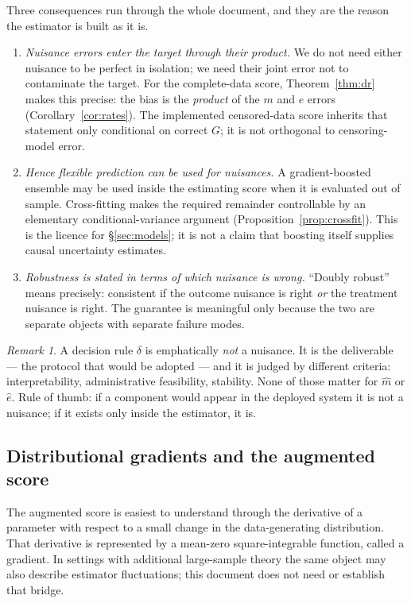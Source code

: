\documentclass[11pt,a4paper]{article}
\theoremstyle{plain}
\theoremstyle{definition}
\theoremstyle{remark}
\newtheorem*{remark*}{Remark}
\begin{document}
Three consequences run through the whole document, and they are the reason the estimator is
built as it is.

\begin{enumerate}[leftmargin=*]
\item \emph{Nuisance errors enter the target through their product.} We do not need either
nuisance to be perfect in isolation; we need their joint error not to contaminate the target.
For the complete-data score, Theorem~\ref{thm:dr} makes this precise: the bias is the
\emph{product} of the $m$ and $e$ errors (Corollary~\ref{cor:rates}). The implemented
censored-data score inherits that statement only conditional on correct $G$; it is not
orthogonal to censoring-model error.
\item \emph{Hence flexible prediction can be used for nuisances.} A gradient-boosted ensemble
may be used inside the estimating score when it is evaluated out of sample. Cross-fitting makes
the required remainder controllable by an elementary conditional-variance argument
(Proposition~\ref{prop:crossfit}). This is the licence for \S\ref{sec:models}; it is not a claim
that boosting itself supplies causal uncertainty estimates.
\item \emph{Robustness is stated in terms of which nuisance is wrong.} ``Doubly robust'' means
precisely: consistent if the outcome nuisance is right \emph{or} the treatment nuisance is
right. The guarantee is meaningful only because the two are separate objects with separate
failure modes.
\end{enumerate}

\begin{remark*}
A decision rule $\delta$ is emphatically \emph{not} a nuisance. It is the deliverable --- the
protocol that would be adopted --- and it is judged by different criteria: interpretability,
administrative feasibility, stability. None of those matter for $\hat m$ or $\hat e$. Rule of
thumb: if a component would appear in the deployed system it is not a nuisance; if it exists
only inside the estimator, it is.
\end{remark*}

\subsection{Distributional gradients and the augmented score}\label{app:eif}

The augmented score is easiest to understand through the derivative of a parameter with respect
to a small change in the data-generating distribution. That derivative is represented by a
mean-zero square-integrable function, called a gradient. In settings with additional
large-sample theory the same object may also describe estimator fluctuations; this document
does not need or establish that bridge.
\end{document}
